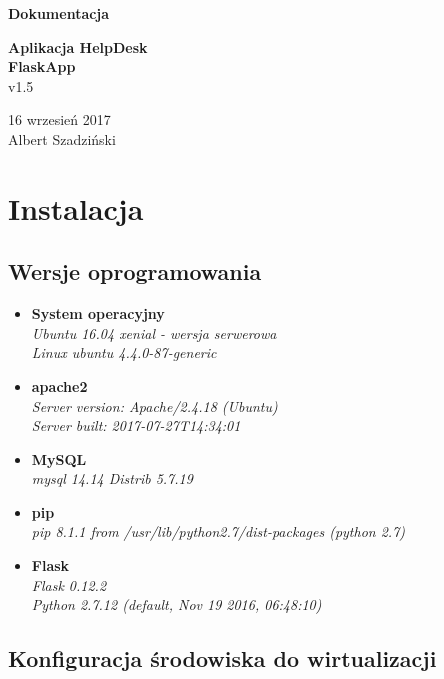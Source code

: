 \documentclass[12pt,a4paper]{article}
\begin{document}
\thispagestyle{empty}
\begin{center}
{\huge \textbf{Dokumentacja}\\[2.7in]}

\textbf{{\LARGE Aplikacja HelpDesk\\ FlaskApp}}\\

{\large v1.5}\\[4.7in]
\end{center}
\begin{flushright}
\begin{large}
16 wrzesień 2017\\
Albert Szadziński

\end{large}
\end{flushright}


\newpage
\tableofcontents
\newpage

\section{Instalacja}
\subsection{Wersje oprogramowania}
\begin{itemize}
\item \textbf{System operacyjny} \\
\textit{Ubuntu 16.04 xenial - wersja serwerowa\\
Linux ubuntu 4.4.0-87-generic}
\item \textbf{apache2}\\
\textit{Server version: Apache/2.4.18 (Ubuntu)\\
Server built:   2017-07-27T14:34:01}
\item \textbf{MySQL}\\
\textit{mysql 14.14 Distrib 5.7.19}
\item \textbf{pip}\\
\textit{pip 8.1.1 from /usr/lib/python2.7/dist-packages (python 2.7)}
\item \textbf{Flask} \\
\textit{Flask 0.12.2\\
Python 2.7.12 (default, Nov 19 2016, 06:48:10) \\}
\end{itemize}


\subsection{Konfiguracja środowiska do wirtualizacji}
\quad
\end{document}
